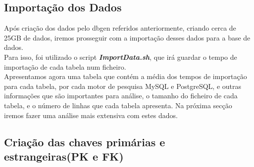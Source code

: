 \documentclass{article}
\begin{document}
\subsection{Importação dos Dados}
\quad Após criação dos dados pelo dbgen referidos anteriormente, criando cerca de 25GB de dados, iremos prosseguir com a importação desses dados para a base de dados. \\
Para isso, foi utilizado o script \textbf{\textit{ImportData.sh}}, que irá guardar o tempo de importação de cada tabela num ficheiro. \\
\quad Apresentamos agora uma tabela que contém a média dos tempos de importação para cada tabela, por cada motor de pesquisa MySQL e PostgreSQL, e outras informações que são importantes para análise, o tamanho do ficheiro de cada tabela, e o número de linhas que cada tabela apresenta.
\quad Na próxima secção iremos fazer uma análise mais extensiva com estes dados.\\
\begin{table}[H]
    \centering
    \renewcommand{\arraystretch}{1.7}
    \caption{Tempo de importação com 25GB de base de dados. Informações acerca de cada tabela.}
    \label{tab:BC_Table1}
  \end{table}


\clearpage
\subsection{Criação das chaves primárias e estrangeiras(PK e FK)}
\end{document}
